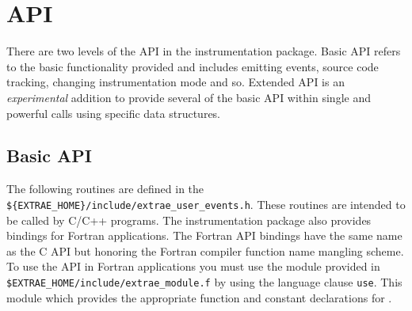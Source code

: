 \chapter{\TRACE API}\label{cha:API}

There are two levels of the API in the \TRACE instrumentation package. Basic API refers to the basic functionality provided and includes emitting events, source code tracking, changing instrumentation mode and so. Extended API is an {\em experimental} addition to provide several of the basic API within single and powerful calls using specific data structures.

\section{Basic API}\label{sec:BasicAPI}

The following routines are defined in the {\tt \$\{EXTRAE\_HOME\}/include/extrae\_user\_events.h}. These routines are intended to be called by C/C++ programs. The instrumentation package also provides bindings for Fortran applications. The Fortran API bindings have the same name as the C API but honoring the Fortran compiler function name mangling scheme. To use the API in Fortran applications you must use the module provided in {\tt \${EXTRAE\_HOME}/include/extrae\_module.f} by using the language clause {\tt use}. This module which provides the appropriate function and constant declarations for \TRACE.


